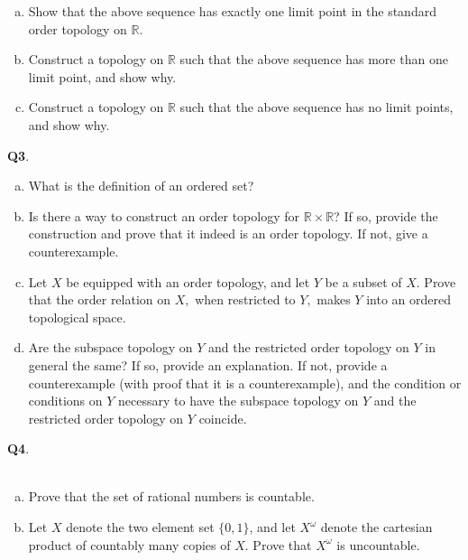 \documentclass[12pt, oneside]{amsart}
\newcommand{\rr}{\mathbb{R}}
\begin{document}
 \vspace{1cm}
\begin{enumerate}[a)]
  \item
     Show that the above sequence has exactly one limit point in the standard order topology on $\rr$. 
     \vspace{8cm}
   \item
     Construct a topology on $\rr$ such that the above sequence has more than one limit point, and show why.
     \vspace{8cm}
   \item
     Construct a topology on $\rr$ such that the above sequence has no limit points, and show why.
   \end{enumerate}
\newpage
\noindent
\textbf{Q3}.
\vspace{1cm}
\begin{enumerate}[a)]
  \item
    What is the definition of an ordered set?    \vspace{6cm}
  \item
    Is there a way to construct an order topology for $\rr \times \rr$? If so, provide the construction and prove that it indeed is an order topology. If not, give a counterexample. 
    \newpage
\item
  Let $X$ be equipped with an order topology, and let $Y$ be a subset of $X$. Prove that the order relation on $X,$ when restricted to $Y,$ makes $Y$ into an ordered topological space. 
  \vspace{12cm}

\item 
  Are the subspace topology on $Y$ and the restricted order topology on $Y$ in general the same? If so, provide an explanation. If not, provide a counterexample (with proof that it is a counterexample), and the condition or conditions on $Y$ necessary to have the subspace topology on $Y$ and the restricted order topology on $Y$ coincide.  
  \newpage
   \end{enumerate}
\newpage
\noindent

\newpage
\noindent
\textbf{Q4}. \\ \\ \begin{enumerate}[a)]
  \item
Prove that the set of rational numbers is countable. 
\vspace{10cm}
\item
Let $X$ denote the two element set $\{0,1 \}$, and let $X^{\omega}$ denote the cartesian product of countably many copies of $X$. Prove that $X^{\omega}$ is uncountable.
  \newpage
\end{enumerate}
\end{document}
